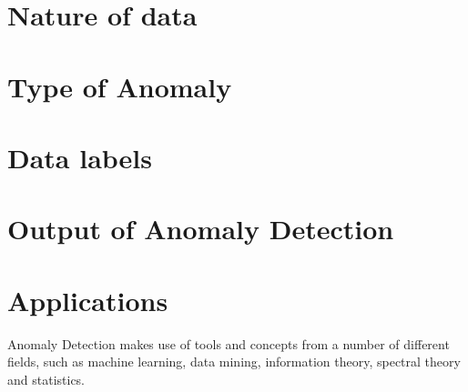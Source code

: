 \section{Nature of data}

\section{Type of Anomaly}

\section{Data labels}

\section{Output of Anomaly Detection}

\section{Applications}


Anomaly Detection makes use of tools and concepts from a number of different fields, such as machine learning, data mining, information theory, spectral theory and statistics.